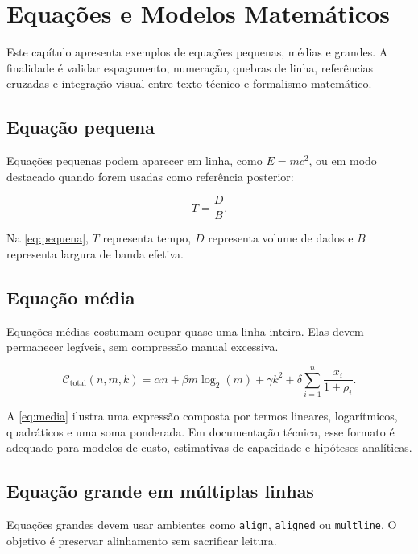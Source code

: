 \chapter{Equações e Modelos Matemáticos}

Este capítulo apresenta exemplos de equações pequenas, médias e grandes. A finalidade é validar espaçamento, numeração, quebras de linha, referências cruzadas e integração visual entre texto técnico e formalismo matemático.

\section{Equação pequena}

Equações pequenas podem aparecer em linha, como $E = mc^2$, ou em modo destacado quando forem usadas como referência posterior:

\begin{equation}
\label{eq:pequena}
T = \frac{D}{B}.
\end{equation}

Na \cref{eq:pequena}, $T$ representa tempo, $D$ representa volume de dados e $B$ representa largura de banda efetiva.

\section{Equação média}

Equações médias costumam ocupar quase uma linha inteira. Elas devem permanecer legíveis, sem compressão manual excessiva.

\begin{equation}
\label{eq:media}
\mathcal{C}_{\mathrm{total}}(n,m,k)=\alpha n + \beta m\log_2(m) + \gamma k^2 + \delta\sum_{i=1}^{n}\frac{x_i}{1+\rho_i}.
\end{equation}

A \cref{eq:media} ilustra uma expressão composta por termos lineares, logarítmicos, quadráticos e uma soma ponderada. Em documentação técnica, esse formato é adequado para modelos de custo, estimativas de capacidade e hipóteses analíticas.

\section{Equação grande em múltiplas linhas}

Equações grandes devem usar ambientes como \texttt{align}, \texttt{aligned} ou \texttt{multline}. O objetivo é preservar alinhamento sem sacrificar leitura.


